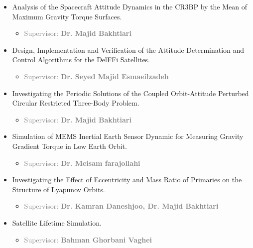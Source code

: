 \documentclass[10pt,a4paper,times]{moderncv}
\begin{document}
\begin{itemize}

\item Analysis of the Spacecraft Attitude Dynamics in the CR3BP by the Mean of Maximum Gravity Torque Surfaces.
\begin{itemize}
	\item \textcolor{gray}{Supervisor: \textbf{Dr. Majid Bakhtiari } }
\end{itemize}

\item Design, Implementation and Verification of the Attitude Determination and Control Algorithms for the DelFFi Satellites.
\begin{itemize}
	\item \textcolor{gray}{Supervisor: \textbf{ Dr. Seyed Majid Esmaeilzadeh} }
\end{itemize}

\item Investigating the Periodic Solutions of the Coupled Orbit-Attitude Perturbed Circular Restricted Three-Body Problem. 
\begin{itemize}
	\item \textcolor{gray}{Supervisor: \textbf{Dr. Majid Bakhtiari} }
\end{itemize}


\item Simulation of MEMS Inertial Earth Sensor Dynamic for Measuring Gravity Gradient Torque in Low Earth Orbit.
\begin{itemize}
	\item \textcolor{gray}{Supervisor: \textbf{Dr. Meisam farajollahi} }
\end{itemize}


\item Investigating the Effect of Eccentricity and Mass Ratio of Primaries on the Structure of Lyapunov Orbits.
\begin{itemize}
	\item \textcolor{gray}{Supervisor: \textbf{Dr. Kamran Daneshjoo, Dr. Majid Bakhtiari}}
\end{itemize}

\item Satellite Lifetime Simulation.
\begin{itemize}
	\item \textcolor{gray}{Supervisor: \textbf{Bahman Ghorbani Vaghei} }
\end{itemize}
\end{itemize}
\end{document}
